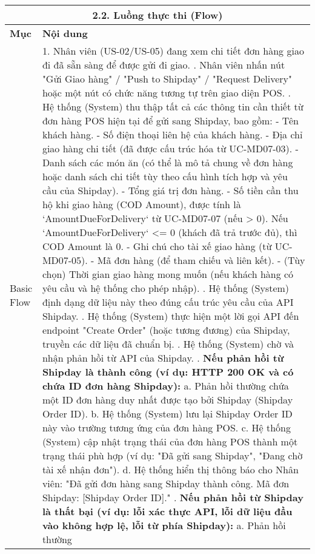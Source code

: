 \begin{longtable}{|m{4cm}|p{11cm}|}
\hline
\multicolumn{2}{|c|}{\textbf{2.2. Luồng thực thi (Flow)}} \\
\hline
\textbf{Mục} & \textbf{Nội dung} \\
\hline
Basic Flow & 1. Nhân viên (US-02/US-05) đang xem chi tiết đơn hàng giao đi đã sẵn sàng để được gửi đi giao. \newline 2. Nhân viên nhấn nút "Gửi Giao hàng" / "Push to Shipday" / "Request Delivery" hoặc một nút có chức năng tương tự trên giao diện POS. \newline 3. Hệ thống (System) thu thập tất cả các thông tin cần thiết từ đơn hàng POS hiện tại để gửi sang Shipday, bao gồm: \newline    - Tên khách hàng. \newline    - Số điện thoại liên hệ của khách hàng. \newline    - Địa chỉ giao hàng chi tiết (đã được cấu trúc hóa từ UC-MD07-03). \newline    - Danh sách các món ăn (có thể là mô tả chung về đơn hàng hoặc danh sách chi tiết tùy theo cấu hình tích hợp và yêu cầu của Shipday). \newline    - Tổng giá trị đơn hàng. \newline    - Số tiền cần thu hộ khi giao hàng (COD Amount), được tính là `AmountDueForDelivery` từ UC-MD07-07 (nếu > 0). Nếu `AmountDueForDelivery` <= 0 (khách đã trả trước đủ), thì COD Amount là 0. \newline    - Ghi chú cho tài xế giao hàng (từ UC-MD07-05). \newline    - Mã đơn hàng (để tham chiếu và liên kết). \newline    - (Tùy chọn) Thời gian giao hàng mong muốn (nếu khách hàng có yêu cầu và hệ thống cho phép nhập). \newline 4. Hệ thống (System) định dạng dữ liệu này theo đúng cấu trúc yêu cầu của API Shipday. \newline 5. Hệ thống (System) thực hiện một lời gọi API đến endpoint "Create Order" (hoặc tương đương) của Shipday, truyền các dữ liệu đã chuẩn bị. \newline 6. Hệ thống (System) chờ và nhận phản hồi từ API của Shipday. \newline 7. \textbf{Nếu phản hồi từ Shipday là thành công (ví dụ: HTTP 200 OK và có chứa ID đơn hàng Shipday):} \newline    a. Phản hồi thường chứa một ID đơn hàng duy nhất được tạo bởi Shipday (Shipday Order ID). \newline    b. Hệ thống (System) lưu lại Shipday Order ID này vào trường tương ứng của đơn hàng POS. \newline    c. Hệ thống (System) cập nhật trạng thái của đơn hàng POS thành một trạng thái phù hợp (ví dụ: "Đã gửi sang Shipday", "Đang chờ tài xế nhận đơn"). \newline    d. Hệ thống hiển thị thông báo cho Nhân viên: "Đã gửi đơn hàng sang Shipday thành công. Mã đơn Shipday: [Shipday Order ID]." \newline 8. \textbf{Nếu phản hồi từ Shipday là thất bại (ví dụ: lỗi xác thực API, lỗi dữ liệu đầu vào không hợp lệ, lỗi từ phía Shipday):} \newline    a. Phản hồi thường 
\end{longtable}

